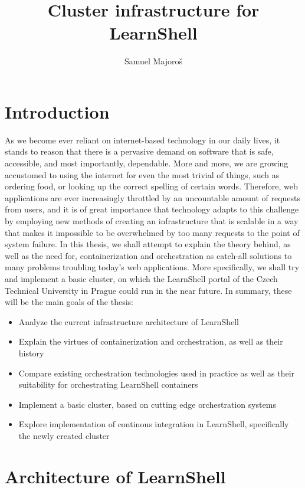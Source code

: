 \documentclass[thesis=B,english]{FITthesis}[2019/12/23]
\title{Cluster infrastructure for LearnShell}
\author{Samuel Majoroš} %
\begin{document}

\chapter{Introduction}

As we become ever reliant on internet-based technology in our daily lives, it stands to reason that there is a pervasive demand on software that is safe, accessible, and most importantly, dependable. More and more, we are growing accustomed to using the internet for even the most trivial of things, such as ordering food, or looking up the correct spelling of certain words. Therefore, web applications are ever increasingly throttled by an uncountable amount of requests from users, and it is of great importance that technology adapts to this challenge by employing new methods of creating an infrastructure that is scalable in a way that makes it impossible to be overwhelmed by too many requests to the point of system failure. In this thesis, we shall attempt to explain the theory behind, as well as the need for, containerization and orchestration as catch-all solutions to many problems troubling today's web applications. More specifically, we shall try and implement a basic cluster, on which the LearnShell portal of the Czech Technical University in Prague could run in the near future. 
\newline
In summary, these will be the main goals of the thesis:
\begin{itemize}
  \setlength\itemsep{0em}
  \item Analyze the current infrastructure architecture of LearnShell
  \item Explain the virtues of containerization and orchestration, as well as their history
  \item Compare existing orchestration technologies used in practice as well as their suitability for orchestrating LearnShell containers
  \item Implement a basic cluster, based on cutting edge orchestration systems
  \item Explore implementation of continous integration in LearnShell, specifically the newly created cluster
\end{itemize}


\chapter{Architecture of LearnShell}
\end{document}
